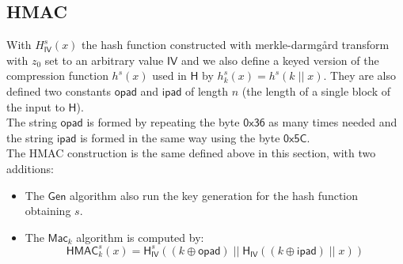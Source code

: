 \subsection{HMAC}
With $H^s_{\mathsf{IV}}(x)$ the hash function constructed with merkle-darmg\r{a}rd transform with $z_0$ set to an arbitrary value $\mathsf{IV}$ and we also define a keyed version of the compression function $h^s(x)$ used in $\mathsf{H}$ by $h^s_k(x) = h^s(k\;||\;x)$. They are also defined two constants $\mathsf{opad}$ and $\mathsf{ipad}$ of length $n$ (the length of a single block of the input to $\mathsf{H}$).\\
The string $\mathsf{opad}$ is formed by repeating the byte $\mathsf{0x36}$ as many times needed and the string $\mathsf{ipad}$ is formed in the same way using the byte $\mathsf{0x5C}$.\\
The HMAC construction is the same defined above in this section, with two additions:
\begin{itemize}
    \item{The $\mathsf{Gen}$ algorithm also run the key generation for the hash function obtaining $s$.}
    \item{The $\mathsf{Mac}_k$ algorithm is computed by:
$$
    \mathsf{HMAC}^s_k(x) = \mathsf{H}^s_\mathsf{IV}((k \oplus \mathsf{opad})\;||\;\mathsf{H}_\mathsf{IV}((k \oplus \mathsf{ipad})\;||\;x))
$$
        }
\end{itemize}
